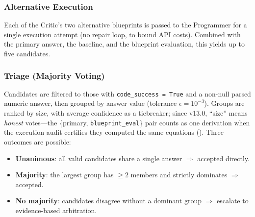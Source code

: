 \documentclass[11pt,a4paper]{article}
\begin{document}
\subsubsection{Alternative Execution}
Each of the Critic's two alternative blueprints is passed to the Programmer for a single execution attempt (no repair loop, to bound API costs).
Combined with the primary answer, the baseline, and the blueprint evaluation, this yields up to five candidates.
\subsubsection{Triage (Majority Voting)}
Candidates are filtered to those with \texttt{code\_success = True} and a non-null parsed numeric answer, then grouped by answer value (tolerance $\epsilon = 10^{-3}$).
Groups are ranked by size, with average confidence as a tiebreaker; since v13.0, ``size'' means \emph{honest} votes---the \{primary, \texttt{blueprint\_eval}\} pair counts as one derivation when the execution audit certifies they computed the same equations ().
Three outcomes are possible:
\begin{itemize}[leftmargin=*,itemsep=2pt]
    \item \textbf{Unanimous}: all valid candidates share a single answer $\Rightarrow$ accepted directly.
    \item \textbf{Majority}: the largest group has $\geq 2$ members and strictly dominates $\Rightarrow$ accepted.
    \item \textbf{No majority}: candidates disagree without a dominant group $\Rightarrow$ escalate to evidence-based arbitration.
\end{itemize}
\end{document}
